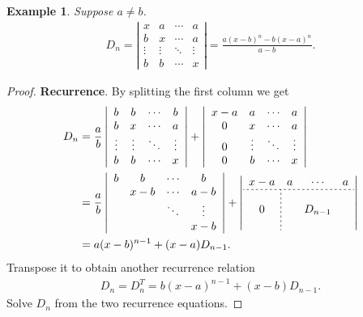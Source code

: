 \documentclass{report}
\newtheorem{example}{Example}[section]
\theoremstyle{nonumberplain}
\newtheorem{proof}{Proof.}
\begin{document}
\begin{example}Suppose $a\ne b$.
	\begin{align*}
		D_{n}=\left|\begin{array}{cccc}
			x      & a      & \cdots & a      \\
			b      & x      & \cdots & a      \\
			\vdots & \vdots & \ddots & \vdots \\
			b      & b      & \cdots & x
		\end{array}\right|=\frac{a(x-b)^{n}-b(x-a)^{n}}{a-b}.
	\end{align*}
\end{example}
\begin{proof}
	\textbf{Recurrence}. By splitting the first column we get
	\begin{equation*}
		\begin{aligned}
			D_{n} & =\frac{a}{b}\left|\begin{array}{cccc}
				b      & b      & \cdots & b      \\
				b      & x      & \cdots & a      \\
				\vdots & \vdots & \ddots & \vdots \\
				b      & b      & \cdots & x
			\end{array}\right|+\left|\begin{array}{cccc}
				x-a & a      & \cdots & a      \\
				0   & x      & \cdots & a      \\
				0   & \vdots & \ddots & \vdots \\
				0   & b      & \cdots & x
			\end{array}\right| \\
			      & =\frac{a}{b}\left|\begin{array}{cccc}
				b & b   & \cdots & b      \\
				  & x-b & \cdots & a-b    \\
				  &     & \ddots & \vdots \\
				  &     &        & x-b
			\end{array}\right|+
			\left|\begin{array}{c;{2pt/2pt}ccc}
				x-a         & a & \cdots  & a \\\hdashline[2pt/2pt]
				            &   &         &   \\
				0           &   & D_{n-1} &   \\
				\phantom{a} &   &         &
			\end{array}\right|                                                             \\
			      & =a(x-b)^{n-1}+(x-a) D_{n-1} .
		\end{aligned}
	\end{equation*}
	Transpose it to obtain another recurrence relation
	\begin{equation*}
		\begin{aligned}
			D_{n}=D_{n}^{T}=b(x-a)^{n-1}+(x-b) D_{n-1}.
		\end{aligned}
	\end{equation*}
	Solve $D_n$ from the two recurrence equations.
\end{proof}
\newpage
\end{document}
